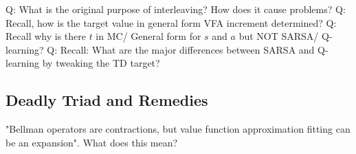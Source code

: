 \documentclass{article}
\begin{document}
\begin{hintbox}
    Q: What is the original purpose of interleaving? How does it cause problems?
    Q: Recall, how is the target value in general form VFA increment determined?
    Q: Recall why is there $t$ in MC/ General form for $s$ and $a$ but NOT SARSA/ Q-learning?
    Q: Recall: What are the major differences between SARSA and Q-learning by tweaking the TD target?
\end{hintbox}

\subsection{Deadly Triad and Remedies}
\begin{hintbox}
    "Bellman operators are contractions, but value function approximation fitting can be an expansion". What does this mean?
\end{hintbox}
\end{document}
